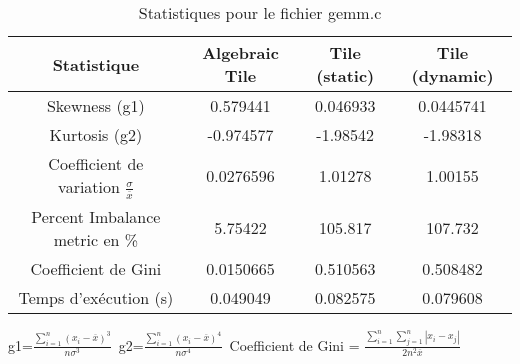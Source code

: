 \documentclass{article}
\begin{document}
\begin{table}[htbp]
  \centering
  \caption{Statistiques pour le fichier gemm.c}
  \begin{tabular}{|c|c|c|c|}
    \hline
    Statistique & Algebraic Tile & Tile (static) & Tile (dynamic) \\ 
    \hline
    Skewness (g1)  & 0.579441 & 0.046933 & 0.0445741 \\ 
    Kurtosis (g2)  & -0.974577 & -1.98542 & -1.98318 \\ 
    Coefficient de variation $ \frac{\sigma}{\overline{x}} $ & 0.0276596 & 1.01278 & 1.00155\\ 
    Percent Imbalance metric en \% & 5.75422 & 105.817 & 107.732\\ 
    Coefficient de Gini  & 0.0150665 & 0.510563 & 0.508482\\ 
    Temps d'exécution (s) &  0.049049    &  0.082575   &  0.079608   \\ 

    \hline
  \end{tabular}
\end{table}
g1=$ \frac{\sum_{i=1}^{n} (x_i - \overline{x})^3}{n\sigma^3} $\
g2=$ \frac{\sum_{i=1}^{n} (x_i - \overline{x})^4}{n\sigma^4} $\
Coefficient de Gini = $ \frac{\sum_{i=1}^{n}\sum_{j=1}^{n} |x_i - x_j|}{2n^2\overline{x}} $\
\newpage
\end{document}
